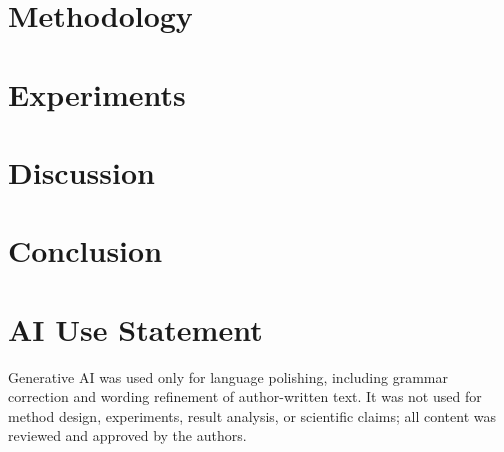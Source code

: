 \documentclass[conference]{IEEEtran}
\begin{document}
\section{Methodology}


\section{Experiments}


\section{Discussion}


\section{Conclusion}


\section*{AI Use Statement}
Generative AI was used only for language polishing, including grammar correction and wording refinement of author-written text. It was not used for method design, experiments, result analysis, or scientific claims; all content was reviewed and approved by the authors.





\end{document}
